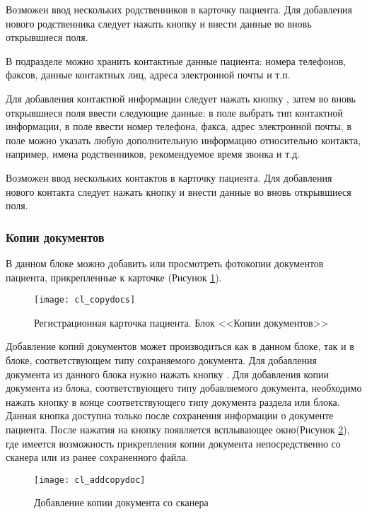{Возможен ввод нескольких родственников в карточку пациента. Для добавления нового родственника следует нажать кнопку  и внести данные во вновь открывшиеся поля.

В подразделе  можно хранить контактные данные пациента: номера телефонов, факсов, данные контактных лиц, адреса электронной почты и т.п.

Для добавления контактной информации следует нажать кнопку , затем во вновь открывшиеся поля ввести следующие данные: в поле  выбрать тип контактной информации, в поле  ввести номер телефона, факса, адрес электронной почты, в поле  можно указать любую дополнительную информацию относительно контакта, например, имена родственников, рекомендуемое время звонка и т.д.

Возможен ввод нескольких контактов в карточку пациента. Для добавления нового контакта следует нажать кнопку  и внести данные во вновь открывшиеся поля.


\subsubsection{Копии документов} \label{cl_copydocs}

В данном блоке можно добавить или просмотреть фотокопии документов пациента, прикрепленные к карточке (Рисунок \ref{img_cl_copydocs}). 

\begin{figure}[ht!]\centering
 \texttt{[image: cl\_copydocs]}
 \caption{Регистрационная карточка пациента. Блок <<Копии документов>>}
 \label{img_cl_copydocs}
\end{figure} 

Добавление копий документов может производиться как в данном блоке, так и в блоке, соответствующем типу сохраняемого документа. Для добавления документа из данного блока нужно нажать кнопку . Для добавления копии документа из блока, соответствующего типу добавляемого документа,  необходимо нажать кнопку  в конце соответствующего типу документа раздела или блока. Данная кнопка доступна только после сохранения информации о документе пациента. После нажатия на кнопку появляется  всплывающее окно(Рисунок \ref{img_cl_addcopydoc}), где имеется возможность прикрепления копии документа непосредственно со сканера или из ранее сохраненного файла.

\begin{figure}[ht]\centering
 \texttt{[image: cl\_addcopydoc]}
 \caption{Добавление копии документа со сканера}
 \label{img_cl_addcopydoc}
\end{figure} 

}
